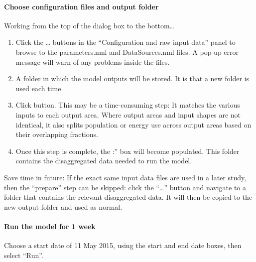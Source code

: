 \documentclass[letterpaper,10pt,english]{sphinxmanual}
\begin{document}
\paragraph{Choose configuration files and output folder}
\label{\detokenize{Tutorials/GQF:choose-configuration-files-and-output-folder}}
Working from the top of the dialog box to the bottom…
\begin{enumerate}
\item {} 
Click the … buttons in the “Configuration and raw input data” panel
to browse to the parameters.nml and DataSources.nml files. A pop-up
error message will warn of any problems inside the files.

\item {} 
 A folder in which the model outputs will be stored.
It is  that a new folder is used each time.

\item {} 
Click  button. This may be a
time-consuming step: It matches the various inputs to each output
area. Where output areas and input shapes are not identical, it also
splits population or energy use across output areas based on their
overlapping fractions.

\item {} 
Once this step is complete, the :” box will become
populated. This folder contains the disaggregated data needed to run
the model.

\end{enumerate}

 Save time in future: If the exact same input data files are
used in a later study, then the “prepare” step can be skipped: click the
“…” button and navigate to a folder that contains the relevant
disaggregated data. It will then be copied to the new output folder and
used as normal.


\paragraph{Run the model for 1 week}
\label{\detokenize{Tutorials/GQF:run-the-model-for-1-week}}
Choose a start date of 11 May 2015, using the start and end date boxes,
then select “Run”.
\begin{quote}

\begin{figure}[htbp]
\centering
\capstart

\noindent{}
\caption{}\label{\detokenize{Tutorials/GQF:id2}}\end{figure}
\end{quote}
\end{document}
